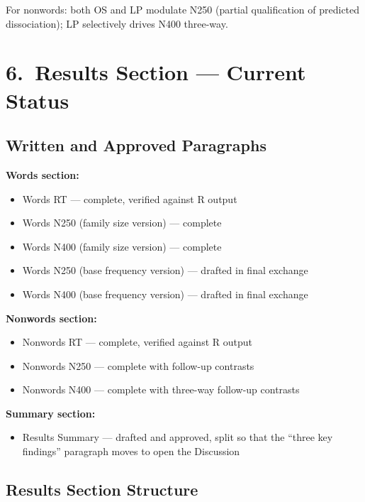 \documentclass[11pt, a4paper]{article}
\newcommand{\done}{$\checkmark$}
\begin{document}
\smallskip
For nonwords: both OS and LP modulate N250 (partial qualification of predicted dissociation); LP selectively drives N400 three-way.

\section{6.\ Results Section — Current Status}

\subsection{Written and Approved Paragraphs}

\textbf{Words section:}
\begin{itemize}[leftmargin=1.5em]
  \item[\done] Words RT — complete, verified against R output
  \item[\done] Words N250 (family size version) — complete
  \item[\done] Words N400 (family size version) — complete
  \item[\done] Words N250 (base frequency version) — drafted in final exchange
  \item[\done] Words N400 (base frequency version) — drafted in final exchange
\end{itemize}

\textbf{Nonwords section:}
\begin{itemize}[leftmargin=1.5em]
  \item[\done] Nonwords RT — complete, verified against R output
  \item[\done] Nonwords N250 — complete with follow-up contrasts
  \item[\done] Nonwords N400 — complete with three-way follow-up contrasts
\end{itemize}

\textbf{Summary section:}
\begin{itemize}[leftmargin=1.5em]
  \item[\done] Results Summary — drafted and approved, split so that the ``three key findings'' paragraph moves to open the Discussion
\end{itemize}

\subsection{Results Section Structure}
\end{document}
